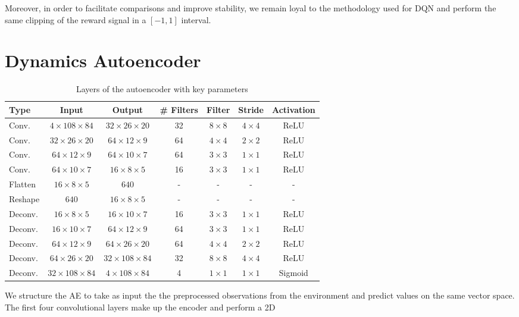 Moreover, in order to facilitate comparisons and improve stability, we remain 
loyal to the methodology used for DQN and perform the same clipping of the 
reward signal in a $[-1, 1]$ interval. 

\section{Dynamics Autoencoder}
%
\begin{table}[h]
    \centering
    \begin{tabular}{l c c c c c c} 
	\hline
	Type & Input & Output & \# Filters & Filter & Stride & Activation \\ 
	\hline 
	Conv. & $4 \times 108 \times 84$ & $32 \times 26 \times 20$ & 32 & $8 \times 8$ & $4 \times 4$ & ReLU \\ 
	Conv. & $32 \times 26 \times 20$ & $64 \times 12 \times 9$ & 64 & $4 \times 4$ & $2 \times 2$ & ReLU \\ 
	Conv. & $64 \times 12 \times 9$ & $64 \times 10 \times 7$ & 64 & $3 \times 3$ & $1 \times 1$ & ReLU \\ 
	Conv. & $64 \times 10 \times 7$ & $16 \times 8 \times 5$ & 16 & $3 \times 3$ & $1 \times 1$ & ReLU \\ 
	Flatten	& $16 \times 8 \times 5$ & $640$ & - & - & - & - \\ 
	\hline
	Reshape & $640$ & $16 \times 8 \times 5$ & - & - & - & - \\
	Deconv. & $16 \times 8 \times 5$ & $16 \times 10 \times 7$ & 16 & $3 \times 3$ & $1 \times 1$ & ReLU \\ 
	Deconv. & $16 \times 10 \times 7$ & $64 \times 12 \times 9$ & 64 & $3 \times 3$ & $1 \times 1$ & ReLU \\
	Deconv. & $64 \times 12 \times 9$ & $64 \times 26 \times 20$ & 64 & $4 \times 4$ & $2 \times 2$ & ReLU \\
	Deconv. & $64 \times 26 \times 20$ & $32 \times 108 \times 84$ & 32 & $8 \times 8$ & $4 \times 4$ & ReLU \\
	Deconv. & $32 \times 108 \times 84$ & $4 \times 108 \times 84$ & 4 & $1 \times 1$ & $1 \times 1$ & Sigmoid \\
	\hline
    \end{tabular}
    \caption{Layers of the autoencoder with key parameters}
    \label{t:AE_structure}
\end{table}
%
We structure the AE to take as input the the preprocessed observations from the
environment and predict values on the same vector space.
The first four convolutional layers make up the encoder and perform a 2D 
